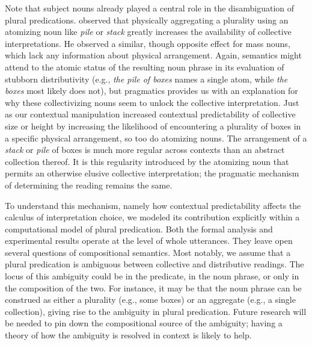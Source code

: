 \documentclass[preprint,12pt,authoryear,titlepage]{elsarticle}
\newcommand{\ndg}[1]{\textcolor{Green}{[ndg: #1]}}
\newcommand{\gcs}[1]{\textcolor{blue}{[gcs: #1]}}
\begin{document}
Note that subject nouns already played a central role in the disambiguation of plural predications. \cite{schwarzschild2011} observed that physically aggregating a plurality using an atomizing noun like \emph{pile} or \emph{stack} greatly increases the availability of collective interpretations. He observed a similar, though opposite effect for mass nouns, which lack any information about physical arrangement. Again, semantics might attend to the atomic status of the resulting noun phrase in its evaluation of stubborn distributivity (e.g., \emph{the pile of boxes} names a single atom, while \emph{the boxes} most likely does not), but pragmatics provides us with an explanation for why these collectivizing nouns seem to unlock the collective interpretation. Just as our contextual manipulation increased contextual predictability of collective size or height by increasing the likelihood of encountering a plurality of boxes in a specific physical arrangement, so too do atomizing nouns. The arrangement of a \emph{stack} or \emph{pile} of boxes is much more regular across contexts than an abstract collection thereof. It is this regularity introduced by the atomizing noun that permits an otherwise elusive collective interpretation; the pragmatic mechanism of determining the reading remains the same.


To understand this mechanism, namely how contextual predictability affects the calculus of interpretation choice, we modeled its contribution explicitly within a computational model of plural predication. Both the formal analysis and experimental results operate at the level of whole utterances. They leave open several questions of compositional semantics. Most notably, we assume that a plural predication is ambiguous between collective and distributive readings. The locus of this ambiguity could be in the predicate, in the noun phrase, or only in the composition of the two. For instance, it may be that the noun phrase can be construed as either a plurality (e.g., some boxes) or an aggregate (e.g., a single collection), giving rise to the ambiguity in plural predication. Future research will be needed to pin down the compositional source of the ambiguity; having a theory of how the ambiguity is resolved in context is likely to help. %
\end{document}
